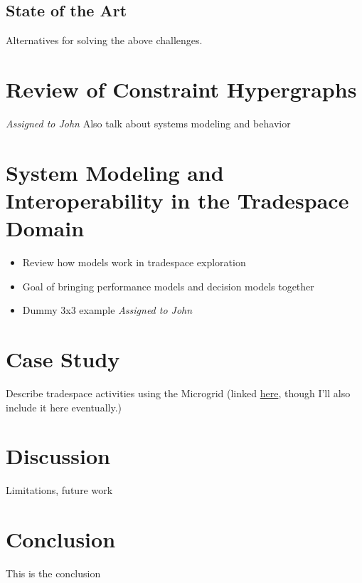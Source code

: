 \documentclass[nocopyright,upint,varvw,barcolor=black,mathalfa=cal=euler,balance,hyphenate, main=english, nolists]{asmejour}
\begin{document}
\subsection{State of the Art}
Alternatives for solving the above challenges.

\section{Review of Constraint Hypergraphs} \label{sec:chgreview}
\textit{Assigned to John}
Also talk about systems modeling and behavior

\section{System Modeling and Interoperability in the Tradespace Domain} \label{sec:modeling}
\begin{itemize}
	\item Review how models work in tradespace exploration
	\item Goal of bringing performance models and decision models together
	\item Dummy 3x3 example \textit{Assigned to John}
\end{itemize}

\section{Case Study} \label{sec:casestudy}
Describe tradespace activities using the Microgrid (linked \href{https://github.com/jmorris335/MicrogridHg}{here}, though I'll also include it here eventually.)

\section{Discussion}
Limitations, future work

\section{Conclusion}
This is the conclusion

\nocite{*}


\end{document}
